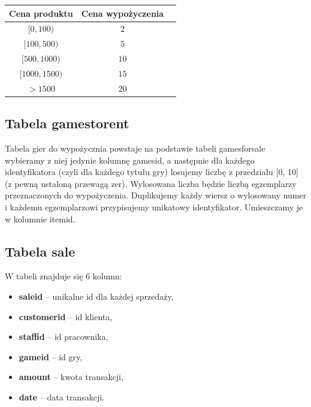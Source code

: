 \documentclass{article}
\begin{document}
	\begin{center}\centering
		\begin{tabular}{|c|c|c|}
			\hline
			\textbf{Cena produktu} & \textbf{Cena wypożyczenia}\\
			\hline
			$[0, 100)$ & $2$\\
			\hline
			$[100, 500)$ & $5$\\
			\hline
			$[500, 1000)$ & $10$\\
			\hline
			$[1000, 1500)$ & $15$\\
			\hline
			$>1500$ & $20$\\
			\hline
		\end{tabular}
	\end{center}
	
	
	
	\subsection{Tabela games\textunderscore to\textunderscore rent}
	Tabela gier do wypożycznia powstaje na podstawie tabeli games\textunderscore for\textunderscore sale wybieramy z niej jedynie kolumnę games\textunderscore id, a następnie dla każdego identyfikatora (czyli dla każdego tytułu gry) losujemy liczbę z przedziału [0, 10] (z pewną ustaloną przewagą zer). Wylosowana liczba będzie liczbą egzemplarzy przeznaczonych do wypożyczenia. Duplikujemy każdy wiersz o wylosowany numer i każdemu egzemplarzowi przypisujemy unikatowy identyfikator. Umieszczamy je w kolumnie item\textunderscore id.
	
	\subsection{Tabela sale}
		W tabeli znajduje się 6 kolumn:
		\begin{itemize}
			\setlength{\itemsep}{-2pt}
			\item \textbf{sale\textunderscore id} – unikalne id dla każdej sprzedaży,
			\item \textbf{customer\textunderscore id} – id klienta,
			\item \textbf{staff\textunderscore id} – id pracownika,
			\item \textbf{game\textunderscore id} – id gry,
			\item \textbf{amount} – kwota transakcji,
			\item \textbf{date} – data transakcji.
		\end{itemize}
\end{document}
